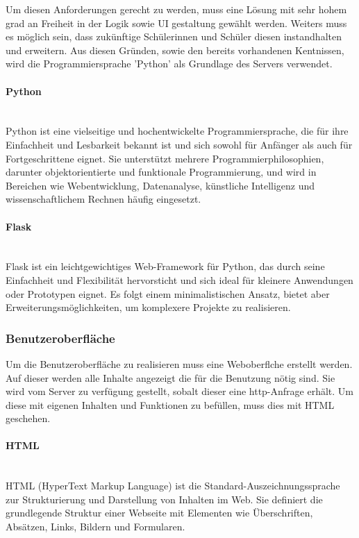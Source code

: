 Um diesen Anforderungen gerecht zu werden, muss eine Lösung mit sehr hohem grad an Freiheit in der Logik sowie UI gestaltung gewählt werden. Weiters muss es möglich sein, dass zukünftige Schülerinnen und Schüler diesen instandhalten und erweitern. Aus diesen Gründen, sowie den bereits vorhandenen Kentnissen, wird die Programmiersprache 'Python' als Grundlage des Servers verwendet.

\paragraph{Python}\mbox{}\\
Python ist eine vielseitige und hochentwickelte Programmiersprache, die für ihre Einfachheit und Lesbarkeit bekannt ist und sich sowohl für Anfänger als auch für Fortgeschrittene eignet. Sie unterstützt mehrere Programmierphilosophien, darunter objektorientierte und funktionale Programmierung, und wird in Bereichen wie Webentwicklung, Datenanalyse, künstliche Intelligenz und wissenschaftlichem Rechnen häufig eingesetzt. \cite{chatgpt}

\paragraph{Flask}\mbox{}\\
Flask ist ein leichtgewichtiges Web-Framework für Python, das durch seine Einfachheit und Flexibilität hervorsticht und sich ideal für kleinere Anwendungen oder Prototypen eignet. Es folgt einem minimalistischen Ansatz, bietet aber Erweiterungsmöglichkeiten, um komplexere Projekte zu realisieren. \cite{chatgpt}

\subsubsection{Benutzeroberfläche}

Um die Benutzeroberfläche zu realisieren muss eine Weboberflche erstellt werden. Auf dieser werden alle Inhalte angezeigt die für die Benutzung nötig sind. Sie wird vom Server zu verfügung gestellt, sobalt dieser eine http-Anfrage erhält. Um diese mit eigenen Inhalten und Funktionen zu befüllen, muss dies mit HTML geschehen.

\paragraph{HTML}\mbox{}\\
HTML (HyperText Markup Language) ist die Standard-Auszeichnungssprache zur Strukturierung und Darstellung von Inhalten im Web. Sie definiert die grundlegende Struktur einer Webseite mit Elementen wie Überschriften, Absätzen, Links, Bildern und Formularen. \cite{chatgpt}\\

